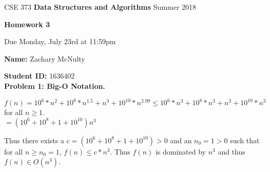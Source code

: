 \documentclass[12pt,a4paper]{article}
\begin{document}
%
%
\begin{center}
CSE 373    \hspace{0.4 cm}  
{\bf Data Structures and Algorithms }
  \hspace{0.4 cm}   Summer 2018
\end{center} 
\vspace{-7 mm}
\noindent \hrulefill
\vspace{3 mm}


%
%

\begin{center}
{\bf \Large Homework 3}

Due Monday, July 23rd at 11:59pm
\end{center}


{\bf Name:} Zachary McNulty

{\bf Student ID:} 1636402\\

%
%

{\bf\large Problem 1: Big-O Notation.}\\

\begin{center}
$f(n) = 10^6 *n^2 + 10^8 * n ^{1.5} + n^3 + 10^{10} * n^{2.99} \leq 10^6 *n^3 + 10^8 * n ^3 + n^3 + 10^{10} * n^3 $ for all $n \geq 1$. \\
$ = (10^6 + 10^8  + 1 + 10^{10}) n^3$\\
\end{center}

Thus there exists a $c = (10^6 + 10^8  + 1 + 10^{10}) > 0$ and an $n_0 = 1 > 0$ such that for all $n \geq n_0 = 1$, $f(n) \leq c*n^3$. Thus $f(n)$ is dominated by $n^3$ and thus $f(n) \in O(n^3)$. \\
\end{document}

